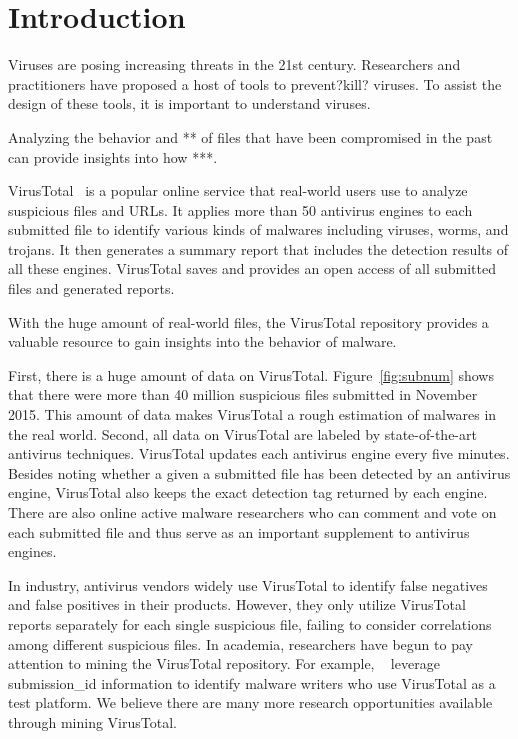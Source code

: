 \section{Introduction}

Viruses are posing increasing threats in the 21st century. 
Researchers and practitioners have proposed a host of tools to prevent?kill? viruses. 
To assist the design of these tools, it is important to understand viruses.

Analyzing the behavior and ** of files that have been compromised in the past
can provide insights into how ***.

VirusTotal~\cite{virustotal} is a popular online service that real-world users use to analyze suspicious files and URLs.
It applies more than 50 antivirus engines to each submitted file 
to identify various kinds of malwares including viruses, worms, and trojans. 
It then generates a summary report that includes the detection results of all these engines. 
VirusTotal saves and provides an open access of all submitted files and generated reports. 

With the huge amount of real-world files, 
the VirusTotal repository provides a valuable resource to gain insights into 
the behavior of malware.

First, there is a huge amount of data on VirusTotal.
Figure~\ref{fig:subnum} shows that there were more than 40 million suspicious files 
submitted in November 2015. 
This amount of data makes VirusTotal a rough estimation of malwares in the real world. 
Second, all data on VirusTotal are labeled by state-of-the-art antivirus techniques. 
VirusTotal updates each antivirus engine every five minutes. 
Besides noting whether a given a submitted file has been detected by an antivirus engine, 
VirusTotal also keeps the exact detection tag returned by each engine. 
There are also online active malware researchers 
who can comment and vote on each submitted file 
and thus serve as an important supplement to antivirus engines. 

In industry, antivirus vendors widely use VirusTotal to identify false negatives 
and false positives in their products. 
However, they only utilize VirusTotal reports separately for each single suspicious file, 
failing to consider correlations among different suspicious files. 
In academia, researchers have begun to pay attention to mining the VirusTotal repository. 
For example, ~\citet{neeles} leverage submission\_id information to identify malware writers 
who use VirusTotal as a test platform. 
We believe there are many more research opportunities available through mining VirusTotal. 


